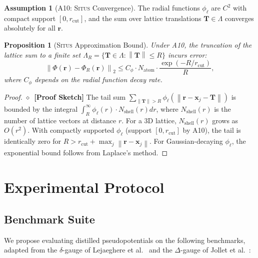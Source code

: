 \documentclass[11pt,a4paper]{article}
\newtheorem{proposition}[theorem]{Proposition}
\theoremstyle{definition}
\newtheorem{assumption}[theorem]{Assumption}
\newcommand{\rigorSketch}[0]{$\diamond$~\textbf{[Proof Sketch]}}
\newcommand{\Situs}{\textsc{Situs}}
\newcommand{\norm}[1]{\left\lVert#1\right\rVert}
\begin{document}
\begin{assumption}[A10: \Situs{} Convergence]\label{ass:A10}
The radial functions $\phi_\ell$ are $C^2$ with compact support $[0, r_{\mathrm{cut}}]$, and the sum over lattice translations $\mathbf{T} \in \Lambda$ converges absolutely for all $\mathbf{r}$.
\end{assumption}

\begin{proposition}[\Situs{} Approximation Bound]\label{prop:situs_bound}
Under A10, the truncation of the lattice sum to a finite set $\Lambda_R = \{\mathbf{T} \in \Lambda: \norm{\mathbf{T}} \leq R\}$ incurs error:
\begin{equation}
\norm{\Phi(\mathbf{r}) - \Phi_R(\mathbf{r})}_2 \leq C_\phi \cdot N_{\mathrm{atom}} \cdot \frac{\exp(-R/r_{\mathrm{cut}})}{R},
\end{equation}
where $C_\phi$ depends on the radial function decay rate.
\end{proposition}

\begin{proof}\rigorSketch
The tail sum $\sum_{\norm{\mathbf{T}} > R} \phi_\ell(\norm{\mathbf{r} - \mathbf{x}_j - \mathbf{T}})$ is bounded by the integral $\int_R^\infty \phi_\ell(r) \cdot N_{\mathrm{shell}}(r) dr$, where $N_{\mathrm{shell}}(r)$ is the number of lattice vectors at distance $r$. For a 3D lattice, $N_{\mathrm{shell}}(r)$ grows as $O(r^2)$. With compactly supported $\phi_\ell$ (support $[0, r_{\mathrm{cut}}]$ by A10), the tail is identically zero for $R > r_{\mathrm{cut}} + \max_j \norm{\mathbf{r} - \mathbf{x}_j}$. For Gaussian-decaying $\phi_\ell$, the exponential bound follows from Laplace's method.
\end{proof}

\section{Experimental Protocol }
\label{sec:experiment}

\subsection{Benchmark Suite}

We propose evaluating distilled pseudopotentials on the following benchmarks, adapted from the $\delta$-gauge of Lejaeghere et al.~\cite{Lejaeghere2016} and the $\Delta$-gauge of Jollet et al.~\cite{Jollet2014}:
\end{document}
